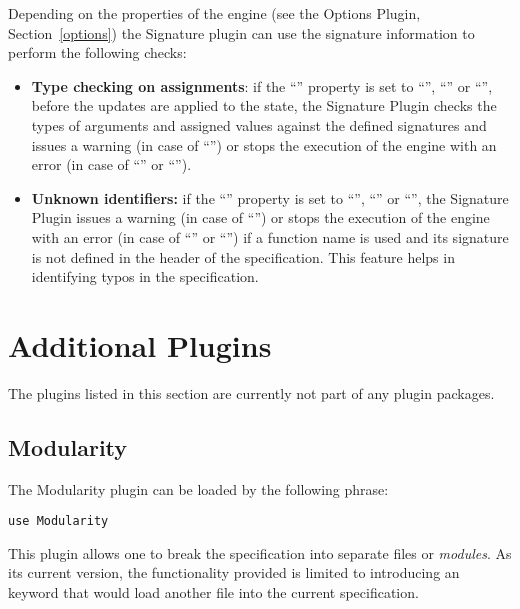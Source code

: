 \documentclass{article}
\begin{document}
\medskip

Depending on the properties of the engine (see the Options Plugin, Section~\ref{options}) the Signature plugin can use the signature information to perform the following checks:
\begin{itemize}

	\item {\bf Type checking on assignments}: if the ``'' property is set to ``'',
	``'' or ``'', before the updates are applied to the state, the Signature Plugin checks the types of arguments and assigned values against the defined signatures and issues a warning (in case of ``'') or stops the execution of the engine with an error (in case of ``'' or ``'').

	\item {\bf Unknown identifiers:} if the ``'' property is set to ``'', ``'' or ``'', the Signature Plugin issues a warning (in case of ``'') or stops the execution of the engine with an error (in case of ``'' or ``'') if a function name is used and its signature is not defined in the header of the specification. This feature helps in identifying typos in the specification. 
\end{itemize}

\section{Additional Plugins}
\label{additional}

The plugins listed in this section are currently not part of any plugin packages.
\subsection{Modularity}
\label{Modularity}

The Modularity plugin can be loaded by the following  phrase:

\begin{lstlisting}
use Modularity
\end{lstlisting}

This plugin allows one to break the specification into separate files or {\em modules}. As its current version, the functionality provided is limited to introducing an  keyword that would load another file into the current specification. 
\begin{quote}  \end{quote}
\end{document}
